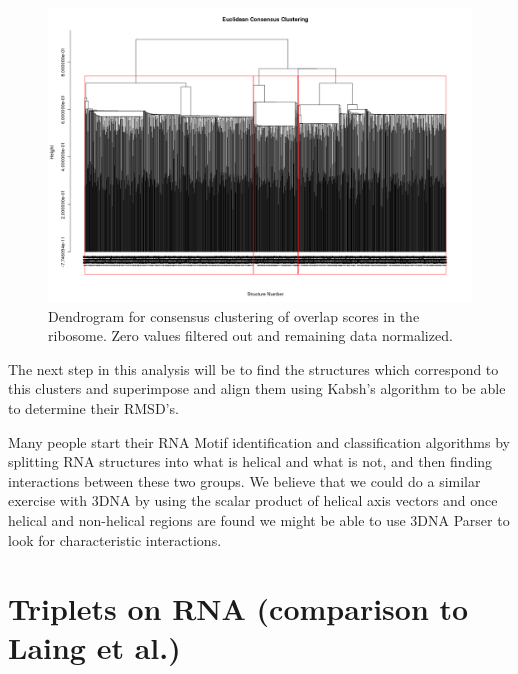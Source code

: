 \begin{figure}[htbp]
\centering 
\includegraphics[angle=90, scale=0.6]{Chapter5/eucli_cons.png}
\caption{Dendrogram for consensus clustering of overlap scores in the ribosome.
Zero values filtered out and remaining data normalized.}
\end{figure}

The next step in this analysis will be to find the structures which
correspond to this clusters and superimpose and align them using
Kabsh's algorithm to be able to determine their RMSD's.

Many people start their RNA Motif identification and classification
algorithms by splitting RNA structures into what is helical and what
is not, and then finding interactions between these two groups. We
believe that we could do a similar exercise with 3DNA by using the scalar
product of helical axis vectors and once helical and non-helical
regions are found we might be able to use 3DNA Parser to look for characteristic
interactions.

\section{Triplets on RNA (comparison to Laing et al.)}




